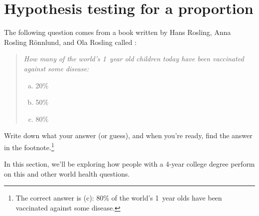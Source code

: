 





\section{Hypothesis testing for a proportion}
\label{hypothesisTesting}



The following question comes from a book written by
Hans Rosling, Anna Rosling R{\"o}nnlund, and Ola Rosling
called \emph{}:
\begin{quote}{\em
  How many of the world's 1~year old children today
  have been vaccinated against some disease:
  \begin{enumerate}[a.]
  \item 20\%
  \item 50\%
  \item 80\%
  \end{enumerate}
}\end{quote}
Write down what your answer (or guess),
and when you're ready, find the answer in the
footnote.\footnote{The correct answer is (c):
  80\% of the world's 1~year olds have been vaccinated
  against some disease.}

In this section,
we'll be exploring how people with a 4-year college
degree perform on this and other world health questions.

\newcommand{\roslingAsize}{50}
\newcommand{\roslingAprop}{0.24}
\newcommand{\roslingApropcomplement}{0.76}
\newcommand{\roslingApercent}{24}
\newcommand{\roslingApercentcomplement}{76}
\newcommand{\roslingAcount}{12}
\newcommand{\roslingAcountcomplement}{38}
\newcommand{\roslingAse}{0.060}


